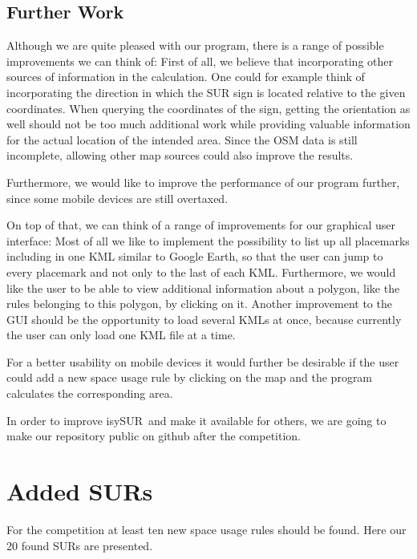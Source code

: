 \documentclass[11pt,fleqn]{book} %
\newcommand{\ProjectTitle}{isySUR}
\newcommand{\pt}{\ProjectTitle}
\begin{document}
\section{Further Work}\label{sec:future_work}
Although we are quite pleased with our program, there is a range of possible improvements we can think of:
First of all, we believe that incorporating other sources of information in the calculation. One could for example think of incorporating the direction in which the SUR sign is located relative to the given coordinates. When querying the coordinates of the sign, getting the orientation as well should not be too much additional work while providing valuable information for the actual location of the intended area. Since the OSM data is still incomplete, allowing other map sources could also improve the results.

Furthermore, we would like to improve the performance of our program further, since some mobile devices are still overtaxed. 

On top of that, we can think of a range of improvements for our graphical user interface:
Most of all we like to implement the possibility to list up all placemarks including in one KML similar to Google Earth, so that the user can jump to every placemark and not only to the last of each KML. Furthermore, we would like the user to be able to view additional information about a polygon, like the rules belonging to this polygon, by clicking on it.
Another improvement to the GUI should be the opportunity to load several KMLs at once, because currently the user can only load one KML file at a time.

For a better usability on mobile devices it would further be desirable if the user could add a new space usage rule by clicking on the map and the program calculates the corresponding area. 

In order to improve \pt\ and make it available for others, we are going to make our repository public on github after the competition.


\chapter{Added SURs}\label{sec:surs}
For the competition at least ten new space usage rules should be found. Here our 20 found SURs are presented.
\end{document}
